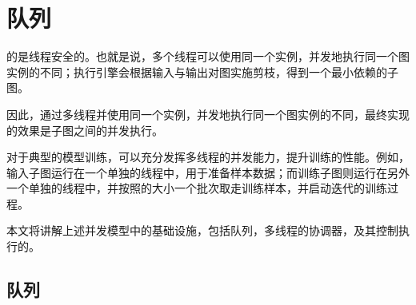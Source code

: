 \begin{savequote}[45mm]
\end{savequote}

\chapter{队列} 
\label{ch:queue}

\begin{content}

的是线程安全的。也就是说，多个线程可以使用同一个实例，并发地执行同一个图实例的不同；执行引擎会根据输入与输出对图实施剪枝，得到一个最小依赖的子图。

因此，通过多线程并使用同一个实例，并发地执行同一个图实例的不同，最终实现的效果是子图之间的并发执行。

对于典型的模型训练，可以充分发挥多线程的并发能力，提升训练的性能。例如，输入子图运行在一个单独的线程中，用于准备样本数据；而训练子图则运行在另外一个单独的线程中，并按照的大小一个批次取走训练样本，并启动迭代的训练过程。

本文将讲解上述并发模型中的基础设施，包括队列，多线程的协调器，及其控制执行的。

\end{content}

\section{队列}

